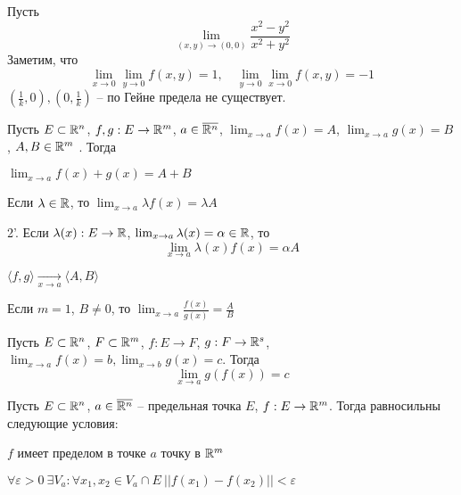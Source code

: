     \begin{Example}
        Пусть
        \[\lim_{(x, y) \to (0, 0)} \frac{x^2 - y^2}{x^2 + y^2}\]
        Заметим, что 
        \[\lim_{x \to 0} \lim_{y \to 0} f(x, y) = 1, \quad \lim_{y \to 0}\lim_{x \to 0} f(x, y) = -1\]
        $\left(\frac{1}{k}, 0\right), \left(0, \frac{1}{k}\right)$ -- по Гейне предела не существует.
    \end{Example}

    \begin{Thm}
        Пусть $E \subset \mathbb{R}^n$, $f, g : E \to \mathbb{R}^m$, $a \in \overline{\mathbb{R}^n}$,
        $\lim_{x \to a} f(x) = A$, $\lim_{x \to a} g(x) = B$, $A, B \in \mathbb{R}^m$ . Тогда
        \begin{MyList}
            \item $\lim_{x \to a} f(x) + g(x) = A + B$
            \item Если $\lambda \in \mathbb{R}$, то $\lim_{x \to a} \lambda f(x) = \lambda A$  
            \item[2'.] Если $\lambda(x) : E \to \mathbb{R}$, $\lim_{x \to a} \lambda(x) = \alpha \in \mathbb{R}$, то 
            \[\lim_{x \to a} \lambda(x) f(x) = \alpha A\]
            \item $\langle f, g\rangle \xrightarrow[x \to a]{} \langle A, B\rangle$
            \item Если $m = 1$, $B \neq 0$, то $\lim_{x \to a} \frac{f(x)}{g(x)} = \frac{A}{B}$ 
        \end{MyList}
    \end{Thm}

    \begin{Thm}
        Пусть $E \subset \mathbb{R}^n$, $F \subset \mathbb{R}^m$, $f : E \to F$, $g : F \to \mathbb{R}^s$, 
        $\lim_{x \to a} f(x) = b, \lim_{x \to b} g(x) = c$. Тогда
        \[\lim_{x \to a} g(f(x)) = c\] 
    \end{Thm}

    \begin{Thm}
        Пусть $E \subset \mathbb{R}^n$, $a \in \overline{\mathbb{R}^n}$ -- предельная точка $E$, $f : E \to \mathbb{R}^m$. 
        Тогда равносильны следующие условия:
        \begin{MyList}
            \item $f$ имеет пределом в точке $a$ точку в $\mathbb{R}^m$ 
            \item $\forall \varepsilon > 0 \ \exists V_a : \forall x_1, x_2 \in V_a \cap E \ ||f(x_1) - f(x_2)|| < \varepsilon$
        \end{MyList}
    \end{Thm}

